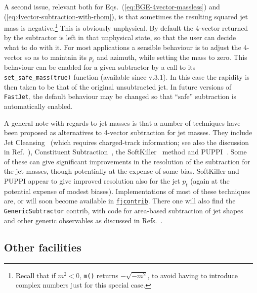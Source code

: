 \documentclass[12pt,a4]{article}
\newcommand{\fastjet}{\texttt{FastJet}\xspace}
\newcommand{\fjcontrib}{\texttt{\href{http://fastjet.hepforge.org/contrib/}{fjcontrib}}\xspace}
\newcommand{\ttt}[1]{{\small\texttt{#1}}}
\begin{document}
A second issue, relevant both for
Eqs.~(\ref{eq:BGE-4vector-massless}) and
(\ref{eq:4vector-subtraction-with-rhom}), is that sometimes the
resulting squared jet mass is negative.\footnote{Recall that if
  $m^2<0$, \ttt{m()} returns $-\sqrt{-m^2}$, to avoid having to
  introduce complex numbers just for this special case.}
%
This is obviously unphysical.
%
By default the 4-vector returned by the subtractor is left in that
unphysical state, so that the user can decide what to do with it.
%
For most applications a sensible behaviour is to adjust the
4-vector so as to maintain its $p_t$ and azimuth, while setting the
mass to zero.
%
This behaviour can be enabled for a given subtractor by a call to
its \ttt{set\_safe\_mass(true)} function (available since v.3.1).
%
In this case the rapidity is then taken to be that of the original
unsubtracted jet.
%
In future versions of \fastjet, the default behaviour may be changed
so that ``safe'' subtraction is automatically enabled.

A general note with regards to jet masses is that a number of
techniques have been proposed as alternatives to 4-vector subtraction
for jet masses.
%
They include Jet Cleansing~\cite{Krohn:2013lba} (which requires
charged-track information; see also the discussion in
Ref.~\cite{Cacciari:2014jta}), Constituent
Subtraction~\cite{Berta:2014eza}, the
SoftKiller~\cite{Cacciari:2014gra} method and
PUPPI~\cite{Bertolini:2014bba}.
%
Some of these can give significant improvements in the resolution of
the subtraction for the jet masses, though potentially at the expense
of some bias.
%
SoftKiller and PUPPI appear to give improved resolution also for the
jet $p_t$ (again at the potential expense of modest biases).
%
Implementations of most of these techniques are, or will soon become
available in \fjcontrib.
%
There one will also find the \ttt{GenericSubtractor} contrib, with
code for area-based subtraction of jet shapes and other generic
observables as discussed in Refs.~\cite{Soyez:2012hv,Cacciari:2012mu}.

\subsection{Other facilities}
\label{sec:BGE-other-facilities}
\end{document}
